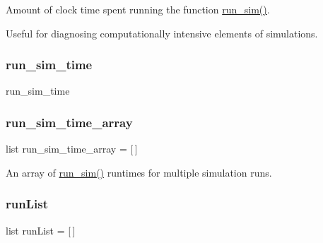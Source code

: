 Amount of clock time spent running the function \mbox{\hyperlink{classdynamicfilterapp_1_1test__simulations_1_1_simulation_test_aafbc405f49645141a30302a448b056dc}{run\+\_\+sim()}}. 

Useful for diagnosing computationally intensive elements of simulations. \mbox{\label{classdynamicfilterapp_1_1test__simulations_1_1_simulation_test_a48e5d77964a889cafe68c9fd684e90c1}} 
\subsubsection{\texorpdfstring{run\_sim\_time}{run\_sim\_time}\hspace{0.1cm}{\footnotesize\ttfamily [2/2]}}
{\footnotesize\ttfamily run\+\_\+sim\+\_\+time}

\mbox{\label{classdynamicfilterapp_1_1test__simulations_1_1_simulation_test_a26bec4b04005dffaddd57bdcd42249f3}} 
\subsubsection{\texorpdfstring{run\_sim\_time\_array}{run\_sim\_time\_array}}
{\footnotesize\ttfamily list run\+\_\+sim\+\_\+time\+\_\+array = \mbox{[}$\,$\mbox{]}\hspace{0.3cm}{\ttfamily [static]}}



An array of \mbox{\hyperlink{classdynamicfilterapp_1_1test__simulations_1_1_simulation_test_aafbc405f49645141a30302a448b056dc}{run\+\_\+sim()}} runtimes for multiple simulation runs. 

\mbox{\label{classdynamicfilterapp_1_1test__simulations_1_1_simulation_test_af0a015ca9f30cd7a3f0fdade090df146}} 
\subsubsection{\texorpdfstring{runList}{runList}}
{\footnotesize\ttfamily list run\+List = \mbox{[}$\,$\mbox{]}\hspace{0.3cm}{\ttfamily [static]}}


